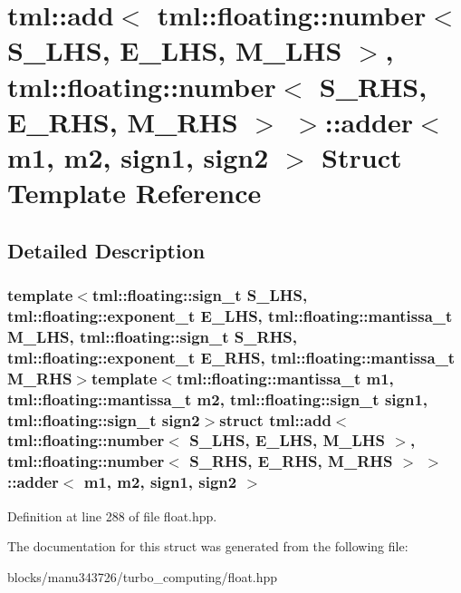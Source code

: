 \hypertarget{structtml_1_1add_3_01tml_1_1floating_1_1number_3_01_s___l_h_s_00_01_e___l_h_s_00_01_m___l_h_s_0118f2f1531f1eb3eb6f65de97c3904eca}{\section{tml\+:\+:add$<$ tml\+:\+:floating\+:\+:number$<$ S\+\_\+\+L\+H\+S, E\+\_\+\+L\+H\+S, M\+\_\+\+L\+H\+S $>$, tml\+:\+:floating\+:\+:number$<$ S\+\_\+\+R\+H\+S, E\+\_\+\+R\+H\+S, M\+\_\+\+R\+H\+S $>$ $>$\+:\+:adder$<$ m1, m2, sign1, sign2 $>$ Struct Template Reference}
\label{structtml_1_1add_3_01tml_1_1floating_1_1number_3_01_s___l_h_s_00_01_e___l_h_s_00_01_m___l_h_s_0118f2f1531f1eb3eb6f65de97c3904eca}
}


\subsection{Detailed Description}
\subsubsection*{template$<$tml\+::floating\+::sign\+\_\+t S\+\_\+\+L\+H\+S, tml\+::floating\+::exponent\+\_\+t E\+\_\+\+L\+H\+S, tml\+::floating\+::mantissa\+\_\+t M\+\_\+\+L\+H\+S, tml\+::floating\+::sign\+\_\+t S\+\_\+\+R\+H\+S, tml\+::floating\+::exponent\+\_\+t E\+\_\+\+R\+H\+S, tml\+::floating\+::mantissa\+\_\+t M\+\_\+\+R\+H\+S$>$template$<$tml\+::floating\+::mantissa\+\_\+t m1, tml\+::floating\+::mantissa\+\_\+t m2, tml\+::floating\+::sign\+\_\+t sign1, tml\+::floating\+::sign\+\_\+t sign2$>$struct tml\+::add$<$ tml\+::floating\+::number$<$ S\+\_\+\+L\+H\+S, E\+\_\+\+L\+H\+S, M\+\_\+\+L\+H\+S $>$, tml\+::floating\+::number$<$ S\+\_\+\+R\+H\+S, E\+\_\+\+R\+H\+S, M\+\_\+\+R\+H\+S $>$ $>$\+::adder$<$ m1, m2, sign1, sign2 $>$}



Definition at line 288 of file float.\+hpp.



The documentation for this struct was generated from the following file\+:\begin{DoxyCompactItemize}
\item 
blocks/manu343726/turbo\+\_\+computing/float.\+hpp\end{DoxyCompactItemize}
